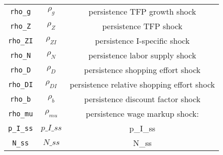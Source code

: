 \begin{center}
\begin{longtable}{ccc}
\texttt{rho\_g} & ${\rho_g}$ & persistence TFP growth shock\\
\texttt{rho\_Z} & ${\rho_Z}$ & persistence TFP shock\\
\texttt{rho\_ZI} & ${\rho_{ZI}}$ & persistence I-specific shock\\
\texttt{rho\_N} & ${\rho_N}$ & persistence labor supply shock\\
\texttt{rho\_D} & ${\rho_D}$ & persistence shopping effort shock\\
\texttt{rho\_DI} & ${\rho_{DI}}$ & persistence relative shopping effort shock\\
\texttt{rho\_b} & ${\rho_b}$ & persistence discount factor shock\\
\texttt{rho\_mu} & ${\rho_{mu}}$ & persistence wage markup shock:\\
\texttt{p\_I\_ss} & $p\_I\_ss$ & p\_I\_ss\\
\texttt{N\_ss} & $N\_ss$ & N\_ss\\
\hline%
\end{longtable}
\end{center}

